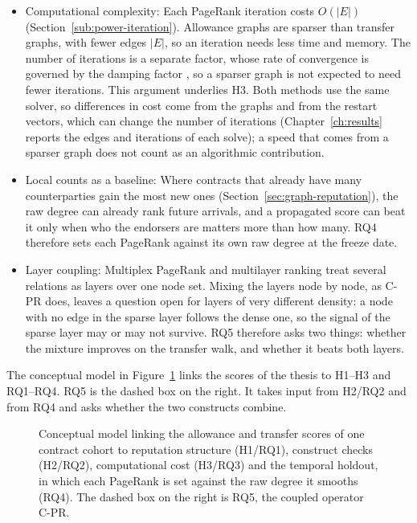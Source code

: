 \begin{itemize}
\item Computational complexity: Each PageRank iteration costs $O(|E|)$ (Section~\ref{sub:power-iteration}). Allowance graphs are sparser than transfer graphs, with fewer edges $|E|$, so an iteration needs less time and memory. The number of iterations is a separate factor, whose rate of convergence is governed by the damping factor \parencite{langville2006pagerank}, so a sparser graph is not expected to need fewer iterations. This argument underlies H3. Both methods use the same solver, so differences in cost come from the graphs and from the restart vectors, which can change the number of iterations (Chapter~\ref{ch:results} reports the edges and iterations of each solve); a speed that comes from a sparser graph does not count as an algorithmic contribution.

\item Local counts as a baseline: Where contracts that already have many counterparties gain the most new ones (Section~\ref{sec:graph-reputation}), the raw degree can already rank future arrivals, and a propagated score can beat it only when who the endorsers are matters more than how many. RQ4 therefore sets each PageRank against its own raw degree at the freeze date.

\item Layer coupling: Multiplex PageRank \parencite{halu2013multiplex} and multilayer ranking \parencite{dedomenico2015ranking} treat several relations as layers over one node set. Mixing the layers node by node, as C-PR does, leaves a question open for layers of very different density: a node with no edge in the sparse layer follows the dense one, so the signal of the sparse layer may or may not survive. RQ5 therefore asks two things: whether the mixture improves on the transfer walk, and whether it beats both layers.
\end{itemize}

The conceptual model in Figure~\ref{fig:conceptual-model} links the scores of the thesis to H1--H3 and RQ1--RQ4. RQ5 is the dashed box on the right. It takes input from H2/RQ2 and from RQ4 and asks whether the two constructs combine.

\begin{figure}[htbp]
\centering

\caption[{Conceptual model: the allowance and transfer scores mapped to reputation structure (H1/RQ1), construct checks (H2/RQ2), computational cost (H3/RQ3), and the temporal holdout of future new approvals and senders against the raw degrees (RQ4).}]{Conceptual model linking the allowance and transfer scores of one contract cohort to reputation structure (H1/RQ1), construct checks (H2/RQ2), computational cost (H3/RQ3) and the temporal holdout, in which each PageRank is set against the raw degree it smooths (RQ4). The dashed box on the right is RQ5, the coupled operator C-PR.}
\label{fig:conceptual-model}
\end{figure}


